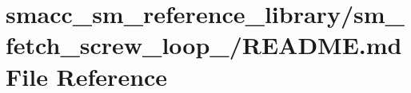 \hypertarget{smacc__sm__reference__library_2sm__fetch__screw__loop__1_2README_8md}{}\section{smacc\+\_\+sm\+\_\+reference\+\_\+library/sm\+\_\+fetch\+\_\+screw\+\_\+loop\+\_/\+R\+E\+A\+D\+ME.md File Reference}
\label{smacc__sm__reference__library_2sm__fetch__screw__loop__1_2README_8md}
